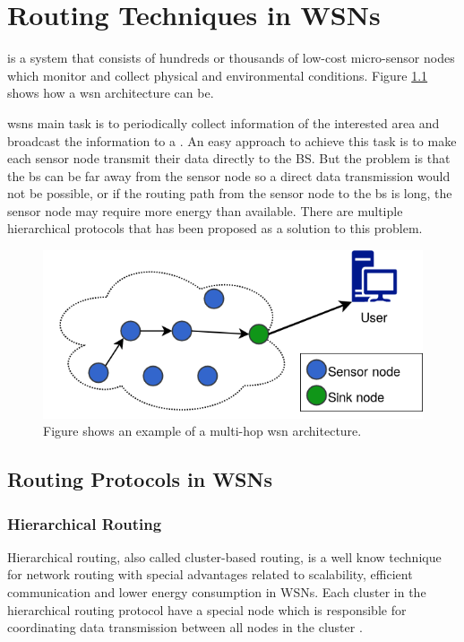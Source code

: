 \documentclass[USenglish]{uit-thesis}
\begin{document}
\chapter{Routing Techniques in WSNs}
 is a system that consists of hundreds or thousands of low-cost micro-sensor nodes which monitor and collect physical and environmental conditions. Figure \ref{fig:wsn} shows how a \gls{wsn} architecture can be. 

\gls{wsn}s  main task is to periodically collect information of the interested area and broadcast the information to a . An easy approach to achieve this task is to make each sensor node transmit their data directly to the BS. But the problem is that the \gls{bs} can be far away from the sensor node so a direct data transmission would not be possible, or if the routing path from the sensor node to the \gls{bs} is long, the sensor node may require more energy than available. There are multiple hierarchical protocols that has been proposed as a solution to this problem.

\begin{figure}
\centering
\includegraphics[width=\textwidth]{wsn.png}
\caption{Figure shows an example of a multi-hop \gls{wsn} architecture.}
\label{fig:wsn}
\end{figure}


\section{Routing Protocols in WSNs}
\subsection{Hierarchical Routing}
Hierarchical routing, also called cluster-based routing, is a well know technique for network routing with special advantages related to scalability, efficient communication and lower energy consumption in WSNs. Each cluster in the hierarchical routing protocol have a special node which is responsible for coordinating data transmission between all nodes in the cluster \cite{leach, leach_perf, routing_survey}.
\end{document}
